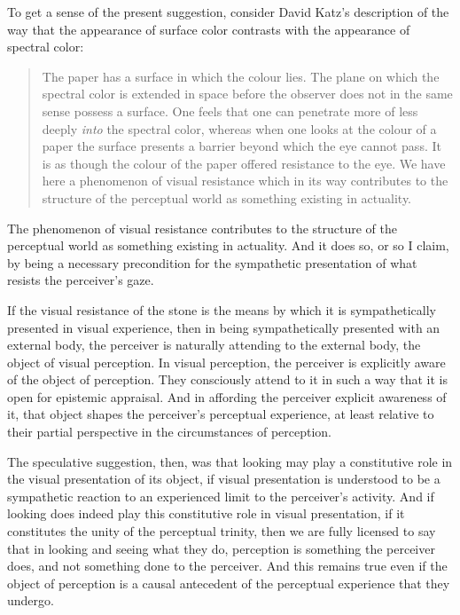\documentclass[12pt]{article}
\begin{document}
To get a sense of the present suggestion, consider David Katz's description of the way that the appearance of surface color contrasts with the appearance of spectral color:
\begin{quote}
	The paper has a surface in which the colour lies. The plane on which the spectral color is extended in space before the observer does not in the same sense possess a surface. One feels that one can penetrate more of less deeply \emph{into} the spectral color, whereas when one looks at the colour of a paper the surface presents a barrier beyond which the eye cannot pass. It is as though the colour of the paper offered resistance to the eye. We have here a phenomenon of visual resistance which in its way contributes to the structure of the perceptual world as something existing in actuality. \citep[8]{Katz:1935qv}
\end{quote}
The phenomenon of visual resistance contributes to the structure of the perceptual world as something existing in actuality. And it does so, or so I claim, by being a necessary precondition for the sympathetic presentation of what resists the perceiver's gaze. 

If the visual resistance of the stone is the means by which it is sympathetically presented in visual experience, then in being sympathetically presented with an external body, the perceiver is naturally attending to the external body, the object of visual perception. In visual perception, the perceiver is explicitly aware of the object of perception. They consciously attend to it in such a way that it is open for epistemic appraisal. And in affording the perceiver explicit awareness of it, that object shapes the perceiver's perceptual experience, at least relative to their partial perspective in the circumstances of perception.

The speculative suggestion, then, was that looking may play a constitutive role in the visual presentation of its object, if visual presentation is understood to be a sympathetic reaction to an experienced limit to the perceiver's activity. And if looking does indeed play this constitutive role in visual presentation, if it constitutes the unity of the perceptual trinity, then we are fully licensed to say that in looking and seeing what they do, perception is something the perceiver does, and not something done to the perceiver. And this remains true even if the object of perception is a causal antecedent of the perceptual experience that they undergo.
\end{document}
